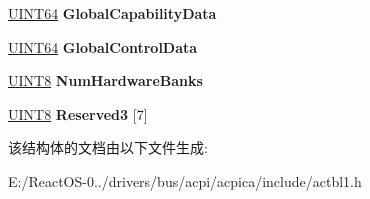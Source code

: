 \begin{DoxyCompactItemize}
\item 
\mbox{\label{structacpi__hest__ia__machine__check_a467b6615c0c0e16d9eec3af53c9c6e63}} 
\hyperlink{_processor_bind_8h_a57be03562867144161c1bfee95ca8f7c}{U\+I\+N\+T64} {\bfseries Global\+Capability\+Data}
\item 
\mbox{\label{structacpi__hest__ia__machine__check_abeab3c366fbe6f80f68706a90350e347}} 
\hyperlink{_processor_bind_8h_a57be03562867144161c1bfee95ca8f7c}{U\+I\+N\+T64} {\bfseries Global\+Control\+Data}
\item 
\mbox{\label{structacpi__hest__ia__machine__check_aa9e035ba803cfc8fe9ac1c3febc53b1b}} 
\hyperlink{_processor_bind_8h_ab27e9918b538ce9d8ca692479b375b6a}{U\+I\+N\+T8} {\bfseries Num\+Hardware\+Banks}
\item 
\mbox{\label{structacpi__hest__ia__machine__check_a89424590d08bff0560e11cadcb4f08c6}} 
\hyperlink{_processor_bind_8h_ab27e9918b538ce9d8ca692479b375b6a}{U\+I\+N\+T8} {\bfseries Reserved3} \mbox{[}7\mbox{]}
\end{DoxyCompactItemize}


该结构体的文档由以下文件生成\+:\begin{DoxyCompactItemize}
\item 
E\+:/\+React\+O\+S-\/0../drivers/bus/acpi/acpica/include/actbl1.\+h\end{DoxyCompactItemize}
